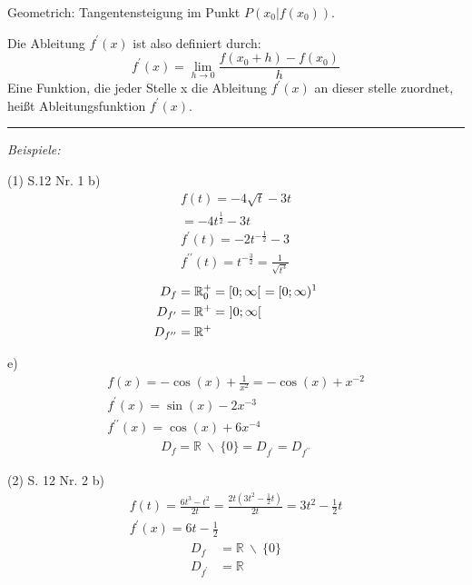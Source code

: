 Geometrich: Tangentensteigung im Punkt $P(x_0|f(x_0))$.

Die Ableitung $f^{\prime}(x)$ ist also definiert durch:
$$f^{\prime}(x)=\lim_{h\to 0} \frac{f(x_{0}+h)-f(x_{0})}{h}$$
Eine Funktion, die jeder Stelle x die Ableitung $f^{\prime}(x)$ an dieser stelle zuordnet, heißt Ableitungsfunktion $f^{\prime}(x)$.

\noindent\rule{\textwidth}{1pt}

\textit{Beispiele:}

(1) S.12 Nr. 1 b)
\begin{equation*}
\begin{gathered}
    f(t)  = -4\sqrt{t}-3t \\
    = -4t^{\frac{1}{2}}-3t \\
    f^{\prime}(t)  = -2t^{-\frac{1}{2}}-3 \\
    f^{\prime\prime}(t)  = t^{-\frac{3}{2}} = \frac{1}{\sqrt{t^3}}
\end{gathered}
\end{equation*}
\begin{align*}
    D_f & = \mathbb{R}_0^+ = [0;\infty[ \ = [0;\infty) \text{\footnotemark}\\
    D_{f^\prime} & = \mathbb{R}^+ = \ ]0;\infty[ \\
    D_{f^{\prime\prime}} & = \mathbb{R}^+
\end{align*}

e)
\begin{equation*}
    \begin{gathered}
        f(x)  = -\cos(x) + \frac{1}{x^2} = -\cos(x)+x^{-2} \\
    f^{\prime}(x)  = \sin(x) -2x^{-3} \\
    f^{\prime\prime}(x)  = \cos(x)+6x^{-4}
    \end{gathered}
\end{equation*}
\begin{align*}
    D_f = \mathbb{R} \ \backslash \ \{0\} = D_{f^{\prime}} = D_{f^{\prime\prime}}
\end{align*}

(2) S. 12 Nr. 2 b)
\begin{equation*}
    \begin{gathered}
        f(t)  = \frac{6t^3-t^2}{2t} = \frac{2t(3t^2 - \frac{1}{2}t)}{2t} = 3t^2 - \frac{1}{2}t \\
        f^{\prime}(x)  = 6t - \frac{1}{2}
    \end{gathered}
\end{equation*}
\begin{align*}
    D_f & = \mathbb{R} \ \backslash \ \{0\}  \\
    D_{f^{\prime}} & = \mathbb{R}
\end{align*}

